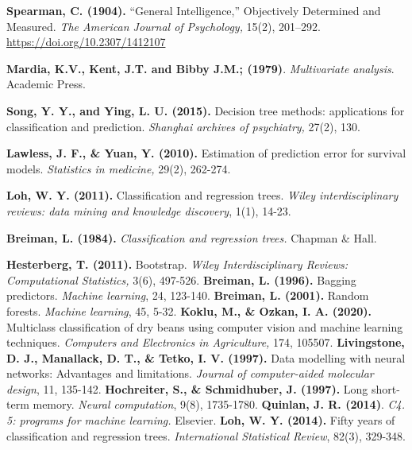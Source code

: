 \begin{thebibliography}{99}
\textbf{Spearman, C. (1904).} “General Intelligence,” Objectively Determined and Measured. \emph{The American Journal of Psychology,} 15(2), 201–292. \url{https://doi.org/10.2307/1412107}

\textbf{Mardia, K.V., Kent, J.T. and Bibby J.M.; (1979)}. \emph{Multivariate analysis}. Academic Press.

\textbf{Song, Y. Y., and Ying, L. U. (2015).} Decision tree methods: applications for classification and prediction. \emph{Shanghai archives of psychiatry,} 27(2), 130.

 \textbf{Lawless, J. F., \& Yuan, Y. (2010).} Estimation of prediction error for survival models. \emph{Statistics in medicine,} 29(2), 262-274.

\textbf{Loh, W. Y. (2011).} Classification and regression trees.\emph{ Wiley interdisciplinary reviews: data mining and knowledge discovery}, 1(1), 14-23.

\textbf{Breiman, L. (1984).} \emph{Classification and regression trees. }Chapman \& Hall.

\textbf{Hesterberg, T. (2011).} Bootstrap. \emph{Wiley Interdisciplinary Reviews: Computational Statistics,} 3(6), 497-526.
\textbf{Breiman, L. (1996).} Bagging predictors. \emph{Machine learning}, 24, 123-140.
\textbf{Breiman, L. (2001).} Random forests. \emph{Machine learning}, 45, 5-32.
\textbf{Koklu, M., \& Ozkan, I. A. (2020).} Multiclass classification of dry beans using computer vision and machine learning techniques. \emph{Computers and Electronics in Agriculture,} 174, 105507.
\textbf{Livingstone, D. J., Manallack, D. T., \& Tetko, I. V. (1997).} Data modelling with neural networks: Advantages and limitations. \emph{Journal of computer-aided molecular design}, 11, 135-142.
\textbf{Hochreiter, S., \& Schmidhuber, J. (1997).} Long short-term memory.\emph{ Neural computation}, 9(8), 1735-1780.
\textbf{Quinlan, J. R. (2014)}. \emph{C4. 5: programs for machine learning.} Elsevier.
\textbf{Loh, W. Y. (2014).} Fifty years of classification and regression trees. \emph{International Statistical Review}, 82(3), 329-348.
\end{thebibliography}
 
